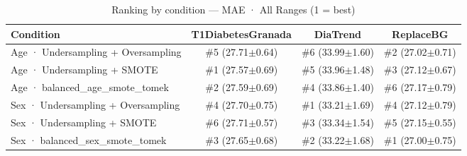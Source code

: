 \begin{table}[htbp]
\centering
\small
\caption{Ranking by condition — MAE · All Ranges  (1 = best)}
\label{tab:ranking_mae_entire_family_size_same_size}
\begin{tabular}{lccc}
\toprule
\textbf{Condition} & \textbf{T1DiabetesGranada} & \textbf{DiaTrend} & \textbf{ReplaceBG} \\
\midrule
Age · Undersampling + Oversampling & \#5 (27.71$\pm$0.64) & \#6 (33.99$\pm$1.60) & \#2 (27.02$\pm$0.71) \\
Age · Undersampling + SMOTE & \#1 (27.57$\pm$0.69) & \#5 (33.96$\pm$1.48) & \#3 (27.12$\pm$0.67) \\
Age · balanced_age_smote_tomek & \#2 (27.59$\pm$0.69) & \#4 (33.86$\pm$1.40) & \#6 (27.17$\pm$0.79) \\
\midrule
Sex · Undersampling + Oversampling & \#4 (27.70$\pm$0.75) & \#1 (33.21$\pm$1.69) & \#4 (27.12$\pm$0.79) \\
Sex · Undersampling + SMOTE & \#6 (27.71$\pm$0.57) & \#3 (33.34$\pm$1.54) & \#5 (27.15$\pm$0.55) \\
Sex · balanced_sex_smote_tomek & \#3 (27.65$\pm$0.68) & \#2 (33.22$\pm$1.68) & \#1 (27.00$\pm$0.75) \\
\bottomrule
\end{tabular}
\end{table}